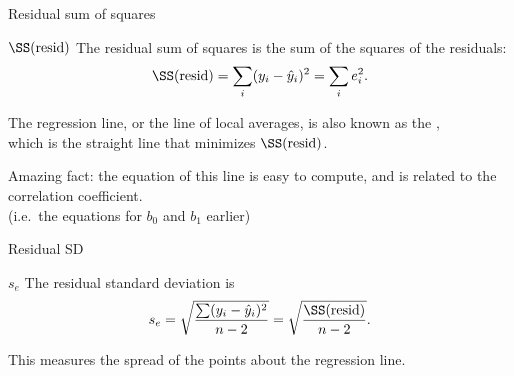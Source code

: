 \begin{frame}{Residual sum of squares}

    \begin{block}{$\SS(\text{resid})$}
        The \alert{residual sum of squares} is the sum of the squares of the residuals:
        \[
            \SS(\text{resid}) = \sum_i (y_i - \hat y_i)^2 = \sum_i e_i^2 .
        \]
    \end{block}

    \vspace{2em}

    The regression line, or the line of local averages, is also known as the ,\\
    which is the straight line that \alert{minimizes} $\SS(\text{resid})$.

    \vspace{2em}

    Amazing fact: the equation of this line is easy to compute,
    and is related to the correlation coefficient. \\
    (i.e.\ the equations for $b_0$ and $b_1$ earlier)


\end{frame}


\begin{frame}{Residual SD}

    \begin{block}{$s_e$}
        The \alert{residual standard deviation} is
        \[ s_e = \sqrt{ \frac{ \sum (y_i - \hat y_i)^2 }{n-2} } = \sqrt{ \frac{ \SS(\text{resid}) }{ n-2 } } .  \]
    \end{block}

    \vspace{2em}

    This measures the spread of the points about the regression line.


\end{frame}



